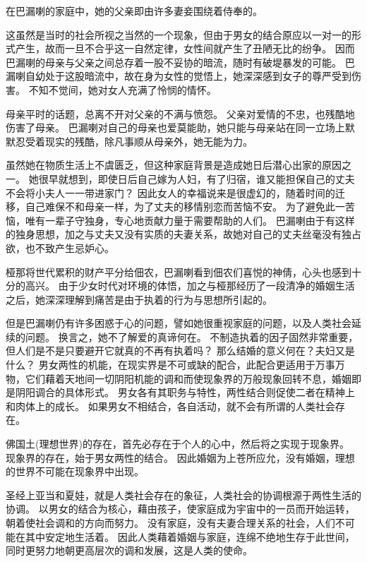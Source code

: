 \documentclass[twoside,openany]{book}
\begin{document}
在巴漏喇的家庭中，她的父亲即由许多妻妾围绕着侍奉的。

这虽然是当时的社会所视之当然的一个现象，但由于男女的结合原应以一对一的形式产生，故而一旦不合乎这一自然定律，女性间就产生了丑陋无比的纷争。
因而巴漏喇的母亲与父亲之间总存着一股不妥协的暗流，随时有破堤暴发的可能。
巴漏喇自幼处于这股暗流中，故在身为女性的觉悟上，她深深感到女子的尊严受到伤害。
不知不觉间，她对女人充满了怜悯的情怀。

母亲平时的话题，总离不开对父亲的不满与愤怨。
父亲对爱情的不忠，也残酷地伤害了母亲。
巴漏喇对自己的母亲也爱莫能助，她只能与母亲站在同一立场上默默忍受着现实的残酷，除凡事顺从母亲外，她无能为力。

虽然她在物质生活上不虞匮乏，但这种家庭背景是造成她日后潜心出家的原因之一。
她很早就想到，即使日后自己嫁为人妇，有了归宿，谁又能担保自己的丈夫不会将小夫人一一带进家门？
因此女人的幸福说来是很虚幻的，随着时间的迁移，自己难保不和母亲一样，为了丈夫的移情别恋而苦恼不安。
为了避免此一苦恼，唯有一辈子守独身，专心地贡献力量于需要帮助的人们。
巴漏喇由于有这样的独身思想，加之与丈夫又没有实质的夫妻关系，故她对自己的丈夫丝毫没有独占欲，也不致产生忌妒心。


桠那将世代累积的财产平分给佃农，巴漏喇看到佃农们喜悦的神倩，心头也感到十分的高兴。
由于少女时代对环境的体悟，加之与桠那经历了一段清净的婚姻生活之后，她深深理解到痛苦是由于执着的行为与思想所引起的。

但是巴漏喇仍有许多困惑于心的问题，譬如她很重视家庭的问题，以及人类社会延续的问题。
换言之，她不了解爱的真谛何在。
不制造执着的因子固然非常重要，但人们是不是只要避开它就真的不再有执着吗？
那么结婚的意义何在？夫妇又是什么？
男女两性的机能，在现实界是不可或缺的配合，此配合更适用于万事万物，它们藉着天地间一切阴阳机能的调和而使现象界的万般现象回转不息，婚姻即是阴阳调合的具体形式。
男女各有其职务与特性，两性结合则促使二者在精神上和肉体上的成长。
如果男女不相结合，各自活动，就不会有所谓的人类社会存在。

佛国土(理想世界)的存在，首先必存在于个人的心中，然后将之实现于现象界。
现象界的存在，始于男女两性的结合。
因此婚姻为上苍所应允，没有婚姻，理想的世界不可能在现象界中出现。

圣经上亚当和夏娃，就是人类社会存在的象征，人类社会的协调根源于两性生活的协调。
以男女的结合为核心，藉由孩子，使家庭成为宇宙中的一员而开始运转，朝着使社会调和的方向而努力。
没有家庭，没有夫妻合理关系的社会，人们不可能在其中安定地生活着。
因此人类藉着婚姻与家庭，连绵不绝地生存于此世间，同时更努力地朝更高层次的调和发展，这是人类的使命。
\end{document}
